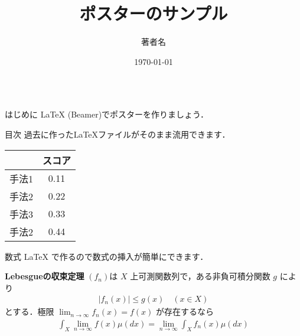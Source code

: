 \documentclass[unicode,colorlinks]{beamer}
\title{ポスターのサンプル}
\author{著者名}
\institute{所属機関名}
\date{\today}
\newcommand{\absolute}[1]{\left|#1\right|}
\newcommand{\parentheses}[1]{\left(#1\right)}
\newcommand{\sequence}[1]{\parentheses{#1}}
\newcommand\simpletheorem[2]{\rmfamily \textbf{#1}\; #2}
\begin{document}
\begin{frame}[fragile]
\begin{columns}[t]
    \begin{column}{.32\linewidth}
        \begin{block}{はじめに}
            \LaTeX{} (Beamer)でポスターを作りましょう．
        \end{block}
        \begin{block}{目次}
            過去に作った\LaTeX ファイルがそのまま流用できます．

            \bigskip
            \bigskip

            \begin{center}
                \begin{tabularx}{0.5\textwidth}{CC}
                    \toprule
                             & スコア \\
                    \midrule
                    手法1    & 0.11   \\
                    手法2    & 0.22   \\
                    手法3    & 0.33   \\
                    手法2    & 0.44   \\
                    \bottomrule
                \end{tabularx}
            \end{center}
        \end{block}

        \begin{block}{数式}
            \LaTeX{} で作るので数式の挿入が簡単にできます．

            \bigskip
            \bigskip

            \simpletheorem{Lebesgueの収束定理}{%
                $\sequence{f_n}$は $X$ 上可測関数列で，ある非負可積分関数 $g$ により
                \begin{align*}
                    \absolute{f_n\parentheses{x}} \leq g\parentheses{x} \quad \parentheses{x \in X}
                \end{align*}
                とする．極限 ${\displaystyle \lim_{n \to \infty}f_n\parentheses{x} = f\parentheses{x}}$ が存在するなら
                \begin{align*}
                    \int_X \lim_{n \to \infty}f\parentheses{x} \mu\parentheses{dx}
                    = \lim_{n \to \infty}\int_X f_n \parentheses{x} \mu\parentheses{dx}
                \end{align*}
            }
        \end{block}


\end{column}
\end{columns}
\end{frame}
\end{document}
